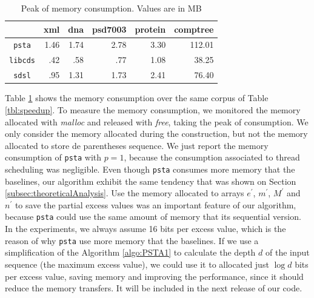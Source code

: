 \begin{table}[ht]
  \centering
  \begin{tabular}{crrrrr}
\hline
    & xml & dna & psd7003 & protein & comptree\\
\hline
 \verb|psta|   &  1.46  &  1.74  & 2.78  &  3.30 & 112.01\\
 \verb|libcds|   &  .42 &  .58 & .77 &  1.08 & 38.25\\
 \verb|sdsl|   &  .95 &  1.31 & 1.73 &  2.41 & 76.40\\
 \hline
\end{tabular}
\caption{Peak of memory consumption. Values are in MB}
\label{tbl:memory_consumption}
\end{table}

	Table \ref{tbl:memory_consumption} shows the memory consumption over the same corpus of Table \ref{tbl:speedup}. To measure the memory consumption, we monitored the memory allocated with \emph{malloc} and released with \emph{free}, taking the peak of consumption. We only consider the memory allocated during the construction, but not the memory allocated to store de parentheses sequence. We just report the memory consumption of {\tt psta} with $p=1$, because the consumption associated to thread scheduling was negligible. Even though {\tt psta} consumes more memory that the baselines, our algorithm exhibit the same tendency that was shown on Section \ref{subsec:theoreticalAnalysis}. Use the memory allocated to arrays $e^{\prime}$, $m^{\prime}$, $M^{\prime}$ and $n^{\prime}$ to save the partial excess values was an important feature of our algorithm, because {\tt psta} could use the same amount of memory that its sequential version. In the experiments, we always assume 16 bits per excess value, which is the reason of why {\tt psta} use more memory that the baselines. If we use a simplification of the Algorithm \ref{algo:PSTA1} to calculate the depth $d$ of the input sequence (the maximum excess value), we could use it to allocated just $\log d$ bits per excess value, saving memory and improving the performance, since it should reduce the memory transfers. It will be included in the next release of our code.














